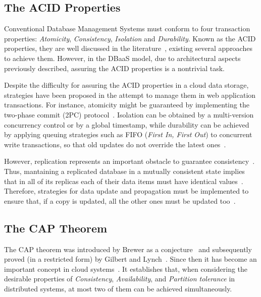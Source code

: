\subsection{The ACID Properties}

Conventional Database Management Systems must conform to four transaction properties: \textit{Atomicity}, \textit{Consistency}, \textit{Isolation} and \textit{Durability}. Known as the ACID properties, %
they are well discussed in the literature~\cite{acid1983}, existing several approaches to achieve them. However, in the DBaaS model, due to architectural aspects previously described, assuring the ACID {properties} is a nontrivial task.

Despite the difficulty for assuring the ACID properties in a cloud data storage, strategies have been proposed in the attempt to manage them in web application transactions. For instance, atomicity might be guaranteed by implementing the two-phase commit (2PC) protocol~\cite{gray1978dbos}. Isolation can be obtained by a multi-version concurrency control %
or by a global timestamp, while durability can be achieved by applying queuing strategies such as FIFO (\emph{First In, First Out}) to concurrent write transactions, so that old updates do not override the latest ones~\cite{Wei:2009}. 

However, replication represents an important obstacle to guarantee consistency~\cite{Abadi09}. %
{\al Thus, mantaining a} replicated database in a mutually consistent state implies that in all of its replicas each of their data items must have identical values~\cite{OzsuValduriez:2011}. Therefore, strategies for data update and propagation must be implemented to ensure that, if a copy is updated, all the other ones must be updated too~\cite{tanenbaum:2007}.

\subsection{The CAP Theorem}

The CAP theorem was introduced by Brewer as a conjecture~\cite{Brewer2000} and subsequently proved 
{\dg (in  a restricted form)} by Gilbert and  Lynch~\cite{Gilbert:2002}. 
{\dg Since then it has become an important concept in cloud systems~\cite{brewer2012}.}
It establishes that, when considering the desirable properties of \textit{Consistency}, \textit{Availability}, and \textit{Partition tolerance} in distributed systems, at most two of them can be achieved simultaneously.

